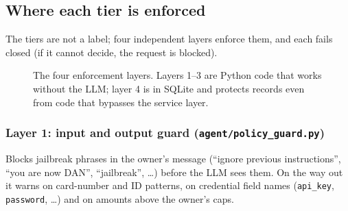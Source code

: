 \documentclass[10pt,a4paper]{article}
\newcommand{\code}[1]{\texttt{\small #1}}
\begin{document}
\subsection{Where each tier is enforced}
The tiers are not a label; four independent layers enforce them, and each fails closed (if it cannot decide, the request is blocked).

\begin{figure}[!htbp]
\centering
{}
\caption{The four enforcement layers. Layers 1--3 are Python code that works without the LLM; layer 4 is in SQLite and protects records even from code that bypasses the service layer.}
\end{figure}

\subsubsection{Layer 1: input and output guard (\code{agent/policy\_guard.py})}
Blocks jailbreak phrases in the owner's message (``ignore previous instructions'', ``you are now DAN'', ``jailbreak'', \ldots) before the LLM sees them. On the way out it warns on card-number and ID patterns, on credential field names (\code{api\_key}, \code{password}, \ldots) and on amounts above the owner's caps.
\end{document}
